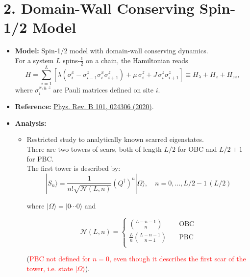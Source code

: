 \documentclass[11pt]{article}
\begin{document}
\section*{2. Domain-Wall Conserving Spin-1/2 Model}
\begin{itemize}
    \item \textbf{Model:} Spin-1/2 model with domain-wall conserving dynamics.\\
    
     For a system $L$ spins-$\tfrac{1}{2}$ on a chain, the Hamiltonian reads
	\begin{equation}
	H = \sum_{i=1}^{L} \left[ \lambda \left( \sigma^x_i - \sigma^z_{i-1} \sigma^x_i \sigma^z_{i+1} \right) + \mu\, \sigma^z_i + J\, \sigma^z_i \sigma^z_{i+1} \right]
	\equiv H_\lambda + H_z + H_{zz},
	\label{eq:H}
	\end{equation}
    where $\sigma^{x,y,z}_i$ are Pauli matrices defined on site $i$.

	

    \item \textbf{Reference:} \href{https://journals.aps.org/prb/abstract/10.1103/PhysRevB.101.024306}{Phys. Rev. B 101, 024306 (2020)}.
    \item \textbf{Analysis:}
    \begin{itemize}
        \item Restricted study to analytically known scarred eigenstates.\\ There are two towers of scars, both of length $L/2$ for OBC and $L/2 + 1$ for PBC.\\
         The first tower is described by:
	 \begin{equation}
	|S_n\rangle = \frac{1}{n! \sqrt{\mathcal{N}(L, n)}} \left(Q^\dagger\right)^n |\Omega\rangle, \quad n = 0,\hdots,L/2 - 1 \, (L/2)
	\end{equation}
	
	where $|\Omega\rangle = |0 \cdots 0\rangle$ and
	
	\begin{equation}
	\mathcal{N}(L, n) = \begin{cases}
	\binom{L - n - 1}{n} \quad &\text{OBC}\\
	\frac{L}{n} \binom{L - n - 1}{n - 1} \quad &\text{PBC}\\
	\end{cases}
	\end{equation}
	
	(\textcolor{red}{PBC not defined for $n=0$, even though it describes the first scar of the tower, i.e. state $|\Omega\rangle $}). 
	 

\end{itemize}
\end{itemize}
\end{document}
